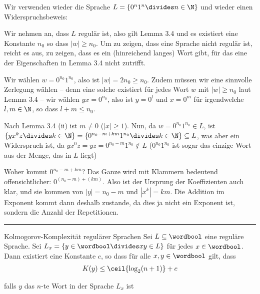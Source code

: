 \newpage
\numberingOff
\inlineex Wir verwenden wieder die Sprache $L = \{ 0^n 1^n \divides n \in \N \}$ und wieder einen Widerspruchsbeweis:

Wir nehmen an, dass $L$ regulär ist, also gilt Lemma 3.4 und es existiert eine Konstante $n_0$ so dass $|w| \geq n_0$.
Um zu zeigen, dass eine Sprache nicht regulär ist, reicht es aus, zu zeigen, dass es ein (hinreichend langes) Wort gibt, für das eine der Eigenschaften in Lemma 3.4 nicht zutrifft.

Wir wählen $w = 0^{n_0} 1^{n_0}$, also ist $|w| = 2n_0 \geq n_0$.
Zudem müssen wir eine sinnvolle Zerlegung wählen -- denn eine solche existiert für jedes Wort $w$ mit $|w| \geq n_0$ laut Lemma 3.4 --
wir wählen $yx = 0^{n_0}$, also ist $y = 0^l$ und $x = 0^m$ für irgendwelche $l, m \in \N$, so dass $l + m \leq n_0$.

Nach Lemma 3.4 (ii) ist $m \neq 0$ ($|x| \geq 1$).
Nun, da $w = 0^{n_0} 1^{n_0} \in L$, ist $\{ yx^kz \divides k \in \N \} = \{ 0^{n_0 - m + km} 1^{n_0} \divides k \in \N \} \subseteq L$, was aber ein Widerspruch ist,
da $yx^0z = yz = 0^{n_0 - m} 1^{n_0} \notin L$ ($0^{n_0}1^{n_0}$ ist sogar das einzige Wort aus der Menge, das in $L$ liegt)

\inlineintuition Woher kommt $0^{n_0 - m + km}$?
Das Ganze wird mit Klammern bedeutend offensichtlicher: $0^{(n_0 - m) + (km)}$.
Also ist der Ursprung der Koeffizienten auch klar, und sie kommen von $|y| = n_0 - m$ und $|x^k| = km$.
Die Addition im Exponent kommt dann deshalb zustande, da dies ja nicht ein Exponent ist, sondern die Anzahl der Repetitionen.

\numberingOn


\vspace{0.3cm}
\hrule
\vspace{0.2cm}


\begin{theorem}[]{Kolmogorov-Komplexität regulärer Sprachen}
    Sei $L \subseteq \wordbool$ eine reguläre Sprache. Sei $L_x = \{ y \in \wordbool \divides xy \in L \}$ für jedes $x \in \wordbool$.
    Dann existiert eine Konstante $c$, so dass für alle $x, y \in \wordbool$ gilt, dass
    \rmvspace
    \begin{align*}
        K(y) \leq \ceil{\log_2(n + 1)} + c
    \end{align*}

    \rmvspace
    falls $y$ das $n$-te Wort in der Sprache $L_x$ ist
\end{theorem}

